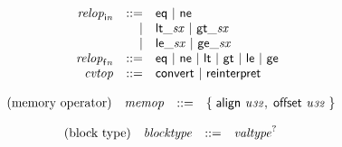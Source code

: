 $$
\begin{array}{@{}lrrl@{}l@{}}
& {{\mathit{relop}}}_{{\mathsf{i}}{{\mathit{n}}}} &::=& \mathsf{eq} ~|~ \mathsf{ne} \\ &&|&
{\mathsf{lt\_}}{{\mathit{sx}}} ~|~ {\mathsf{gt\_}}{{\mathit{sx}}} \\ &&|&
{\mathsf{le\_}}{{\mathit{sx}}} ~|~ {\mathsf{ge\_}}{{\mathit{sx}}} \\
& {{\mathit{relop}}}_{{\mathsf{f}}{{\mathit{n}}}} &::=& \mathsf{eq} ~|~ \mathsf{ne} ~|~ \mathsf{lt} ~|~ \mathsf{gt} ~|~ \mathsf{le} ~|~ \mathsf{ge} \\
& {\mathit{cvtop}} &::=& \mathsf{convert} ~|~ \mathsf{reinterpret} \\
\end{array}
$$

\vspace{1ex}

$$
\begin{array}{@{}lrrl@{}l@{}}
\mbox{(memory operator)} & {\mathit{memop}} &::=& \{\; \begin{array}[t]{@{}l@{}l@{}}
\mathsf{align}~{\mathit{u{\scriptstyle32}}},\; \mathsf{offset}~{\mathit{u{\scriptstyle32}}} \;\}\end{array} \\
\end{array}
$$

\vspace{1ex}

$$
\begin{array}{@{}lrrl@{}l@{}}
\mbox{(block type)} & {\mathit{blocktype}} &::=& {{\mathit{valtype}}^?} \\
\end{array}
$$


